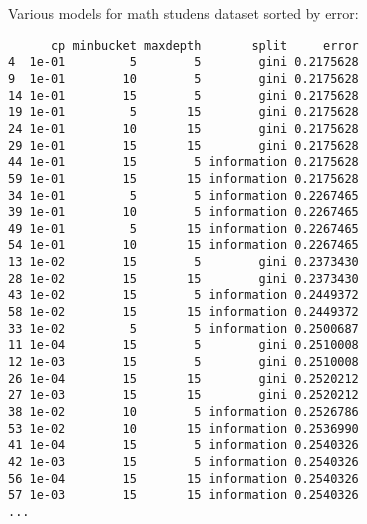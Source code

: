 \documentclass[a4paper]{article}
\begin{document}
Various models for math studens dataset sorted by error:
\begin{verbatim}
      cp minbucket maxdepth       split     error
4  1e-01         5        5        gini 0.2175628
9  1e-01        10        5        gini 0.2175628
14 1e-01        15        5        gini 0.2175628
19 1e-01         5       15        gini 0.2175628
24 1e-01        10       15        gini 0.2175628
29 1e-01        15       15        gini 0.2175628
44 1e-01        15        5 information 0.2175628
59 1e-01        15       15 information 0.2175628
34 1e-01         5        5 information 0.2267465
39 1e-01        10        5 information 0.2267465
49 1e-01         5       15 information 0.2267465
54 1e-01        10       15 information 0.2267465
13 1e-02        15        5        gini 0.2373430
28 1e-02        15       15        gini 0.2373430
43 1e-02        15        5 information 0.2449372
58 1e-02        15       15 information 0.2449372
33 1e-02         5        5 information 0.2500687
11 1e-04        15        5        gini 0.2510008
12 1e-03        15        5        gini 0.2510008
26 1e-04        15       15        gini 0.2520212
27 1e-03        15       15        gini 0.2520212
38 1e-02        10        5 information 0.2526786
53 1e-02        10       15 information 0.2536990
41 1e-04        15        5 information 0.2540326
42 1e-03        15        5 information 0.2540326
56 1e-04        15       15 information 0.2540326
57 1e-03        15       15 information 0.2540326
...
\end{verbatim}
\end{document}
